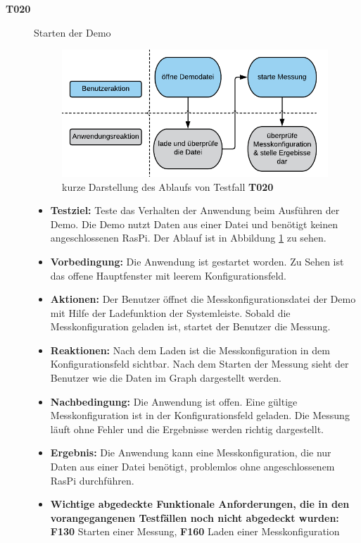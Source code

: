 \documentclass[parskip=full]{scrartcl}
\begin{document}
\begin{description}
\begin{itemize}
\end{itemize}


\item[\textbf{T020}] Starten der Demo 

\begin{figure}[htbp]
	\begin{center}
		\includegraphics[width = 10cm]{Grafik/T020-Ablauf.png}
		\caption{kurze Darstellung des Ablaufs von Testfall \textbf{T020}}
		\label{T020-Ablauf}
	\end{center}
\end{figure}
\begin{itemize}

\item []\textbf{Testziel:} Teste das Verhalten der Anwendung beim Ausführen der Demo. Die Demo nutzt Daten aus einer Datei und benötigt keinen angeschlossenen \gls{RasPi}. Der Ablauf ist in Abbildung \ref{T020-Ablauf} zu sehen.

\item []\textbf{Vorbedingung:} Die Anwendung ist gestartet worden. Zu Sehen ist das offene Hauptfenster mit leerem Konfigurationsfeld.
\item []\textbf{Aktionen:} Der Benutzer öffnet die Messkonfigurationsdatei der Demo mit Hilfe der Ladefunktion der Systemleiste. Sobald die Messkonfiguration geladen ist, startet der Benutzer die Messung.
\item []\textbf{Reaktionen:} Nach dem Laden ist die Messkonfiguration in dem Konfigurationsfeld sichtbar. Nach dem Starten der Messung sieht der Benutzer wie die Daten im Graph dargestellt werden.
\item []\textbf{Nachbedingung:} Die Anwendung ist offen. Eine gültige Messkonfiguration ist in der Konfigurationsfeld geladen. Die Messung läuft ohne Fehler und die Ergebnisse werden richtig dargestellt.

\item []\textbf{Ergebnis:} Die Anwendung kann eine Messkonfiguration, die nur Daten aus einer Datei benötigt, problemlos ohne angeschlossenem \gls{RasPi} durchführen. 
\item []\textbf{Wichtige abgedeckte Funktionale Anforderungen, die in den vorangegangenen Testfällen noch nicht abgedeckt wurden:} \textbf{F130} Starten einer Messung, \textbf{F160} Laden einer Messkonfiguration


\end{itemize}
\end{description}
\end{document}
